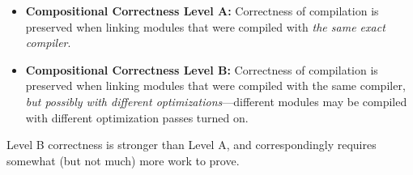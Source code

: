 \begin{itemize}
\item \textbf{Compositional Correctness Level A:} 
Correctness of compilation is preserved when linking modules
that were compiled with \emph{the same exact compiler}.
\item \textbf{Compositional Correctness Level B:} Correctness of
  compilation is preserved when linking modules that were compiled
  with the same compiler, \emph{but possibly with different
    optimizations}---\ie different modules may be compiled with
  different optimization passes turned on.
\end{itemize}
Level B correctness is stronger than Level A, and correspondingly
requires somewhat (but not much) more work to prove.

